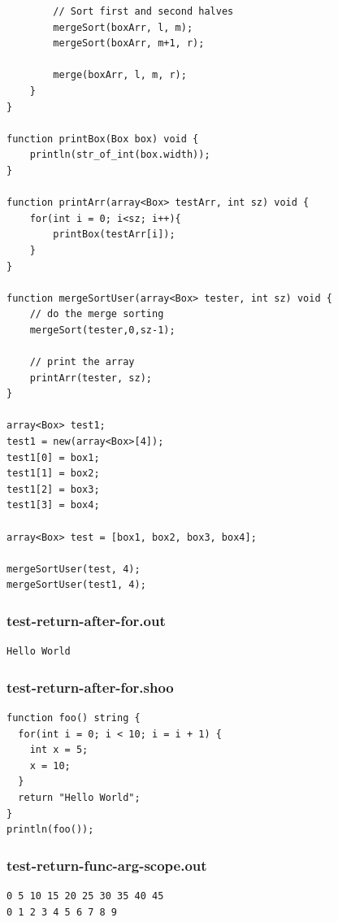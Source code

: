 \documentclass[12pt]{article}
\begin{document}
\begin{mdframed}[hidealllines=true,backgroundcolor=blue!10]
\begin{lstlisting}
        // Sort first and second halves 
        mergeSort(boxArr, l, m);
        mergeSort(boxArr, m+1, r); 
  
        merge(boxArr, l, m, r); 
    } 
}

function printBox(Box box) void {
	println(str_of_int(box.width));
}

function printArr(array<Box> testArr, int sz) void {
	for(int i = 0; i<sz; i++){
		printBox(testArr[i]);
	}
}

function mergeSortUser(array<Box> tester, int sz) void {
	// do the merge sorting
	mergeSort(tester,0,sz-1);

	// print the array
	printArr(tester, sz);
}

array<Box> test1;
test1 = new(array<Box>[4]);
test1[0] = box1;
test1[1] = box2;
test1[2] = box3;
test1[3] = box4;

array<Box> test = [box1, box2, box3, box4];

mergeSortUser(test, 4);
mergeSortUser(test1, 4);
\end{lstlisting}
\end{mdframed}
\subsubsection{test-return-after-for.out}
\begin{mdframed}[hidealllines=true,backgroundcolor=green!10]
\begin{lstlisting}
Hello World
\end{lstlisting}
\end{mdframed}
\subsubsection{test-return-after-for.shoo}
\begin{mdframed}[hidealllines=true,backgroundcolor=blue!10]
\begin{lstlisting}
function foo() string {
  for(int i = 0; i < 10; i = i + 1) {
    int x = 5;
    x = 10;
  }
  return "Hello World";
}
println(foo());\end{lstlisting}
\end{mdframed}
\subsubsection{test-return-func-arg-scope.out}
\begin{mdframed}[hidealllines=true,backgroundcolor=green!10]
\begin{lstlisting}
0 5 10 15 20 25 30 35 40 45 
0 1 2 3 4 5 6 7 8 9 
\end{lstlisting}
\end{mdframed}
\end{document}
